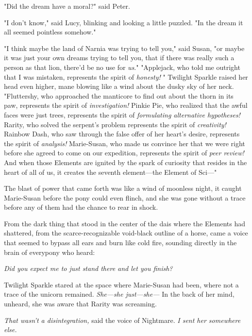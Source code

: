 "Did the dream have a moral?" said Peter.

"I don't know," said Lucy, blinking and looking a little puzzled. "In the dream
it all seemed pointless somehow."

"I think maybe the land of Narnia was trying to tell you," said Susan, "or
maybe it was just your own dreams trying to tell you, that if there was really
such a person as that lion, there'd be no use for \emph{us}."
\sbreak
{}
\medskip
"Applejack, who told me outright that I was mistaken, represents the spirit
of{\el} \emph{honesty!} " Twilight Sparkle raised her head even higher, mane
blowing like a wind about the dusky sky of her neck. "Fluttershy, who
approached the manticore to find out about the thorn in its paw, represents the
spirit of{\el} \emph{investigation!} Pinkie Pie, who realized that the awful
faces were just trees, represents the spirit of{\el} \emph{formulating
alternative hypotheses!} Rarity, who solved the serpent's problem represents
the spirit of{\el} \emph{creativity!} Rainbow Dash, who saw through the
false offer of her heart's desire, represents the spirit of{\el}
\emph{analysis!} Marie-Susan, who made us convince her that we were right
before she agreed to come on our expedition, represents the spirit of{\el}
\emph{peer review!} And when those Elements are ignited by the spark of
curiosity that resides in the heart of all of us, it creates the seventh
element---the Element of Sci\mbox{---}"

The blast of power that came forth was like a wind of moonless night, it caught
Marie-Susan before the pony could even flinch, and she was gone without a trace
before any of them had the chance to rear in shock.

From the dark thing that stood in the center of the dais where the Elements had
shattered, from the scarce-recognizable void-black outline of a horse, came a
voice that seemed to bypass all ears and burn like cold fire, sounding directly
in the brain of everypony who heard:

\emph{Did you expect me to just stand there and let you finish?}

Twilight Sparkle stared at the space where Marie-Susan had been, where not a
trace of the unicorn remained. \emph{She---she just---she---} In the back of
her mind, unheard, she was aware that Rarity was screaming.

\emph{That wasn't a disintegration,} said the voice of Nightmare. \emph{I sent
her somewhere else.}

